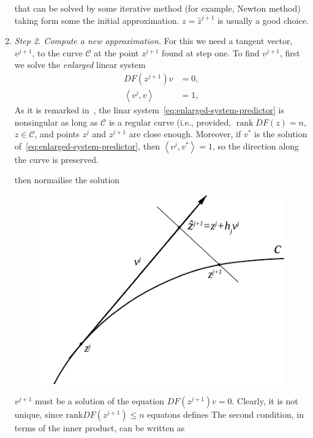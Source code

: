 \documentclass[11pt,reqno,twoside]{article}
\theoremstyle{remark}
\begin{document}
\begin{enumerate}[label = \emph{\arabic*.}]
\begin{displaymath}
    \end{displaymath}
    that can be solved by some iterative method (for example, Newton
    method) taking form some the initial
    approximation. $z = \hat{z}^{j+1}$ is usually a good choice.
  \item \emph{Step 2. Compute a new approximation.} For this we need a
    tangent vector, $v^{j+1}$, to the curve $\mathcal{C}$ at the point
    $z^{j+1}$ found at step one. To find $v^{j+1}$, first we solve the
    \emph{enlarged} linear system
    \begin{equation}\label{eq:enlarged-system-predictor}
      \begin{split}
      DF\left(z^{j+1}\right)v &= 0,\\
      \left\langle v^{j}, v \right\rangle &= 1, 
    \end{split}
  \end{equation}
  As it is remarked in~\cite{Kuznetsov2004}, the linar
  system~\eqref{eq:enlarged-system-predictor} is nonsingular as long as 
  $\mathcal{C}$ is a regular curve (i.e., provided, $\mathop{rank} DF(z) =
  n$, $z\in\mathcal{C}$, and points $z^{j}$ and $z^{j+1}$ are close enough.
  Moreover, if $v^{\ast}$ is the solution
  of~\eqref{eq:enlarged-system-predictor}, then 
  $\left\langle v^{j}, v^{\ast} \right\rangle = 1$, so the direction along the
  curve is preserved. 

  then normailise the solution
%  
\begin{figure}[!t]
  \centering
  \includegraphics[scale=1.2]{arcstep}
 \caption{\label{fig:pseudo-arc}}
\end{figure}


    $v^{j+1}$ must be a solution of the
    equation $DF\left(z^{j+1}\right) v = 0$. Clearly, it is not unique, since
      $\text{rank} DF\left(z^{j+1}\right) \le n$ 
    equatons defines  
  The second condition, in terms of the inner product, can be written as


\end{enumerate}
\end{document}
